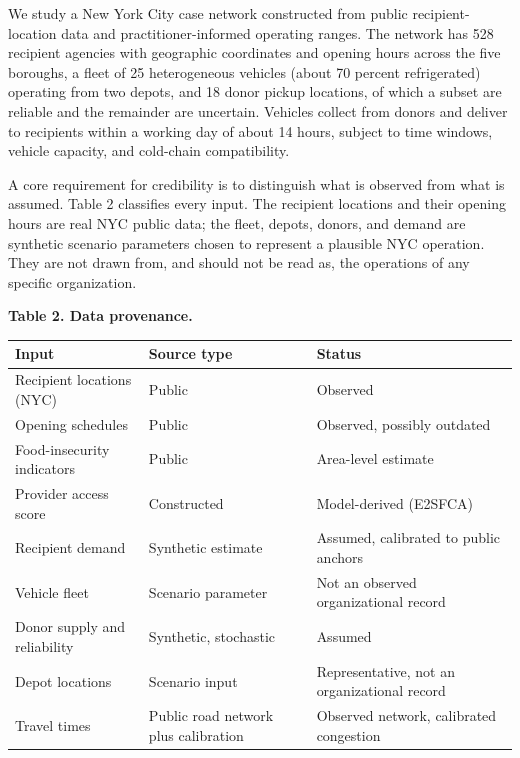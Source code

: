 \documentclass[
  11pt,
]{article}
\newcounter{none} %
\begin{document}
We study a New York City case network constructed from public
recipient-location data and practitioner-informed operating ranges. The
network has 528 recipient agencies with geographic coordinates and
opening hours across the five boroughs, a fleet of 25 heterogeneous
vehicles (about 70 percent refrigerated) operating from two depots, and
18 donor pickup locations, of which a subset are reliable and the
remainder are uncertain. Vehicles collect from donors and deliver to
recipients within a working day of about 14 hours, subject to time
windows, vehicle capacity, and cold-chain compatibility.

A core requirement for credibility is to distinguish what is observed
from what is assumed. Table 2 classifies every input. The recipient
locations and their opening hours are real NYC public data; the fleet,
depots, donors, and demand are synthetic scenario parameters chosen to
represent a plausible NYC operation. They are not drawn from, and should
not be read as, the operations of any specific organization.

\textbf{Table 2. Data provenance.}

{\def\LTcaptype{none} %
\begin{longtable}[]{@{}
  >{\raggedright\arraybackslash}p{}
  >{\raggedright\arraybackslash}p{}
  >{\raggedright\arraybackslash}p{}@{}}
\toprule\noalign{}
\begin{minipage}[b]{\linewidth}\raggedright
Input
\end{minipage} & \begin{minipage}[b]{\linewidth}\raggedright
Source type
\end{minipage} & \begin{minipage}[b]{\linewidth}\raggedright
Status
\end{minipage} \\
\midrule\noalign{}
\endhead
\bottomrule\noalign{}
\endlastfoot
Recipient locations (NYC) & Public & Observed \\
Opening schedules & Public & Observed, possibly outdated \\
Food-insecurity indicators & Public & Area-level estimate \\
Provider access score & Constructed & Model-derived (E2SFCA) \\
Recipient demand & Synthetic estimate & Assumed, calibrated to public
anchors \\
Vehicle fleet & Scenario parameter & Not an observed organizational
record \\
Donor supply and reliability & Synthetic, stochastic & Assumed \\
Depot locations & Scenario input & Representative, not an organizational
record \\
Travel times & Public road network plus calibration & Observed network,
calibrated congestion \\
\end{longtable}
}
\end{document}
